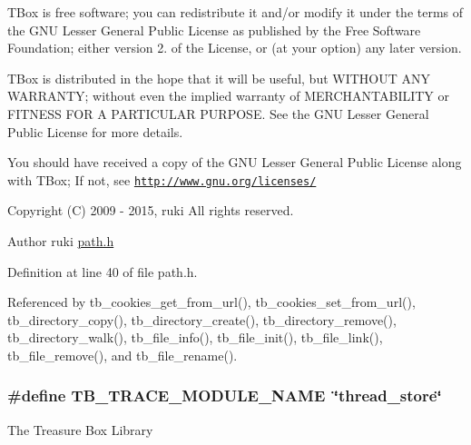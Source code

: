 T\-Box is free software; you can redistribute it and/or modify it under the terms of the G\-N\-U Lesser General Public License as published by the Free Software Foundation; either version 2. of the License, or (at your option) any later version.

T\-Box is distributed in the hope that it will be useful, but W\-I\-T\-H\-O\-U\-T A\-N\-Y W\-A\-R\-R\-A\-N\-T\-Y; without even the implied warranty of M\-E\-R\-C\-H\-A\-N\-T\-A\-B\-I\-L\-I\-T\-Y or F\-I\-T\-N\-E\-S\-S F\-O\-R A P\-A\-R\-T\-I\-C\-U\-L\-A\-R P\-U\-R\-P\-O\-S\-E. See the G\-N\-U Lesser General Public License for more details.

You should have received a copy of the G\-N\-U Lesser General Public License along with T\-Box; If not, see \href{http://www.gnu.org/licenses/}{\tt http\-://www.\-gnu.\-org/licenses/}

Copyright (C) 2009 -\/ 2015, ruki All rights reserved.

\begin{DoxyAuthor}{Author}
ruki  \hyperlink{path_8h_source}{path.\-h} 
\end{DoxyAuthor}


Definition at line 40 of file path.\-h.



Referenced by tb\-\_\-cookies\-\_\-get\-\_\-from\-\_\-url(), tb\-\_\-cookies\-\_\-set\-\_\-from\-\_\-url(), tb\-\_\-directory\-\_\-copy(), tb\-\_\-directory\-\_\-create(), tb\-\_\-directory\-\_\-remove(), tb\-\_\-directory\-\_\-walk(), tb\-\_\-file\-\_\-info(), tb\-\_\-file\-\_\-init(), tb\-\_\-file\-\_\-link(), tb\-\_\-file\-\_\-remove(), and tb\-\_\-file\-\_\-rename().

\hypertarget{group__platform_ga2aa61763aba311653f75dfdea928da4e}{
\subsubsection[{T\-B\-\_\-\-T\-R\-A\-C\-E\-\_\-\-M\-O\-D\-U\-L\-E\-\_\-\-N\-A\-M\-E}]{\setlength{\rightskip}{0pt plus 5cm}\#define T\-B\-\_\-\-T\-R\-A\-C\-E\-\_\-\-M\-O\-D\-U\-L\-E\-\_\-\-N\-A\-M\-E~\char`\"{}thread\-\_\-store\char`\"{}}}\label{group__platform_ga2aa61763aba311653f75dfdea928da4e}
The Treasure Box Library

